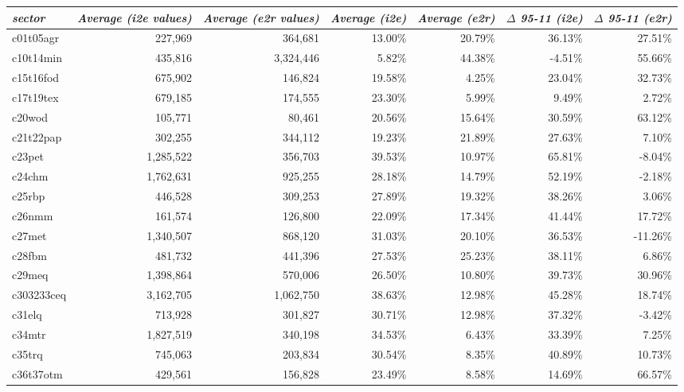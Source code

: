 \documentclass[11pt,a4paper]{article}
\begin{document}
\begin{table}[h]\small
  \centering
    \hspace*{-3cm}
    \begin{tabular}{lrrrrrr}
    \toprule
    \multicolumn{1}{l}{\textit{sector}} & \multicolumn{1}{c}{\textit{Average (i2e values)}} & \multicolumn{1}{c}{\textit{Average (e2r values)}} & \multicolumn{1}{c}{\textit{Average (i2e)}} & \multicolumn{1}{c}{\textit{Average (e2r)}} & \multicolumn{1}{c}{\textit{$\Delta$ 95-11 (i2e)}} & \multicolumn{1}{c}{\textit{$\Delta$ 95-11  (e2r)}} \\
    \midrule
    c01t05agr & 227,969 & 364,681 & 13.00\% & 20.79\% & 36.13\% & 27.51\% \\
    c10t14min & 435,816 & 3,324,446 & 5.82\% & 44.38\% & -4.51\% & 55.66\% \\
    c15t16fod & 675,902 & 146,824 & 19.58\% & 4.25\% & 23.04\% & 32.73\% \\
    c17t19tex & 679,185 & 174,555 & 23.30\% & 5.99\% & 9.49\% & 2.72\% \\
    c20wod & 105,771 & 80,461 & 20.56\% & 15.64\% & 30.59\% & 63.12\% \\
    c21t22pap & 302,255 & 344,112 & 19.23\% & 21.89\% & 27.63\% & 7.10\% \\
    c23pet & 1,285,522 & 356,703 & 39.53\% & 10.97\% & 65.81\% & -8.04\% \\
    c24chm & 1,762,631 & 925,255 & 28.18\% & 14.79\% & 52.19\% & -2.18\% \\
    c25rbp & 446,528 & 309,253 & 27.89\% & 19.32\% & 38.26\% & 3.06\% \\
    c26nmm & 161,574 & 126,800 & 22.09\% & 17.34\% & 41.44\% & 17.72\% \\
    c27met & 1,340,507 & 868,120 & 31.03\% & 20.10\% & 36.53\% & -11.26\% \\
    c28fbm & 481,732 & 441,396 & 27.53\% & 25.23\% & 38.11\% & 6.86\% \\
    c29meq & 1,398,864 & 570,006 & 26.50\% & 10.80\% & 39.73\% & 30.96\% \\
    c303233ceq & 3,162,705 & 1,062,750 & 38.63\% & 12.98\% & 45.28\% & 18.74\% \\
    c31elq & 713,928 & 301,827 & 30.71\% & 12.98\% & 37.32\% & -3.42\% \\
    c34mtr & 1,827,519 & 340,198 & 34.53\% & 6.43\% & 33.39\% & 7.25\% \\
    c35trq & 745,063 & 203,834 & 30.54\% & 8.35\% & 40.89\% & 10.73\% \\
    c36t37otm & 429,561 & 156,828 & 23.49\% & 8.58\% & 14.69\% & 66.57\% \\

\end{tabular}
\end{table}
\end{document}
